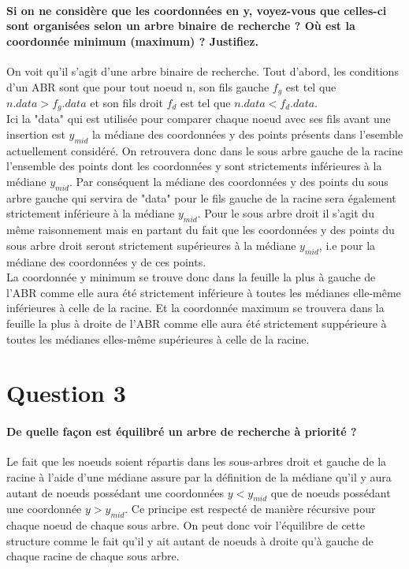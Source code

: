 \documentclass{article}
\begin{document}
    \paragraph{Si on ne considère que les coordonnées en y, voyez-vous que celles-ci sont organisées selon
    un arbre binaire de recherche ? Où est la coordonnée minimum (maximum) ? Justifiez.}
    On voit qu'il s'agit d'une arbre binaire de recherche. Tout d'abord, les conditions d'un ABR sont que pour tout noeud n, son fils gauche $f_g$ est 
    tel que $n.data > f_g.data$ et son fils droit $f_d$ est tel que $n.data < f_d.data$. \\
    Ici la "data" qui est utilisée pour comparer chaque noeud avec ses fils avant une insertion est $y_{mid}$ la médiane des coordonnées y des points
    présents dans l'esemble actuellement considéré. On retrouvera donc dans le sous arbre gauche de la racine l'ensemble des points dont les coordonnées
    y sont strictements inférieures à la médiane $y_{mid}$. Par conséquent la médiane des coordonnées y des points du sous arbre gauche qui servira
    de "data" pour le fils gauche de la racine sera également strictement inférieure à la médiane $y_{mid}$. Pour le sous arbre droit il s'agit du même raisonnement
    mais en partant du fait que les coordonnées y des points du sous arbre droit seront strictement supérieures à la médiane $y_{mid}$, i.e pour la médiane des coordonnées
    y de ces points. \\
    La coordonnée y minimum se trouve donc dans la feuille la plus à gauche de l'ABR comme elle aura été strictement inférieure à toutes les médianes elle-même inférieures
    à celle de la racine. Et la coordonnée maximum se trouvera dans la feuille la plus à droite de l'ABR comme elle aura été strictement suppérieure à toutes
    les médianes elles-même supérieures à celle de la racine.

\newpage
\section{Question 3}
    \paragraph{De quelle façon est équilibré un arbre de recherche à priorité ?}
    Le fait que les noeuds soient répartis dans les sous-arbres droit et gauche de la racine à l'aide d'une médiane assure par la définition de
    la médiane qu'il y aura autant de noeuds possédant une coordonnées $y < y_{mid}$ que de noeuds possédant une coordonnée $y > y_{mid}$.
    Ce principe est respecté de manière récursive pour chaque noeud de chaque sous arbre. On peut donc voir l'équilibre de cette structure comme le fait
    qu'il y ait autant de noeuds à droite qu'à gauche de chaque racine de chaque sous arbre.
\end{document}
